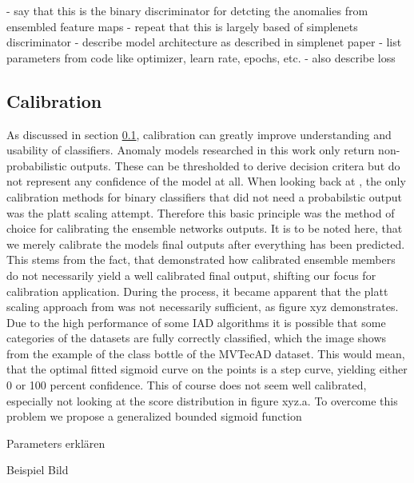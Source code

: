 - say that this is the binary discriminator for detcting the anomalies from ensembled feature maps
- repeat that this is largely based of simplenets discriminator
- describe model architecture as described in simplenet paper
- list parameters from code like optimizer, learn rate, epochs, etc. 
- also describe loss


\subsection{Calibration}
\label{sec:Calibration}

As discussed in section \ref{sec:Calibration}, calibration can greatly improve understanding and usability of classifiers. Anomaly models researched in this work only return non-probabilistic 
outputs. These can be thresholded to derive decision critera but do not represent any confidence of the model at all. When looking back at \cite{Guo_2017_tempscalingetc}, the only calibration 
methods for binary classifiers that did not need a probabilstic output was the platt scaling attempt. Therefore this basic principle was the method of choice for calibrating the ensemble networks 
outputs. It is to be noted here, that we merely calibrate the models final outputs after everything has been predicted. This stems from the fact, that \cite{Wu_2021_shouldbecalibrated} demonstrated 
how calibrated ensemble members do not necessarily yield a well calibrated final output, shifting our focus for calibration application. During the process, it became apparent that the platt 
scaling approach from \cite{Guo_2017_tempscalingetc} was not necessarily sufficient, as figure xyz demonstrates. Due to the high performance of some IAD algorithms it is possible that some categories 
of the datasets are fully correctly classified, which the image shows from the example of the class bottle of the MVTecAD dataset. This would mean, that the optimal fitted sigmoid curve on the points 
is a step curve, yielding either 0 or 100 percent confidence. This of course does not seem well calibrated, especially not looking at the score distribution in figure xyz.a. To overcome this problem 
we propose a generalized bounded sigmoid function 


Parameters erklären

Beispiel Bild









